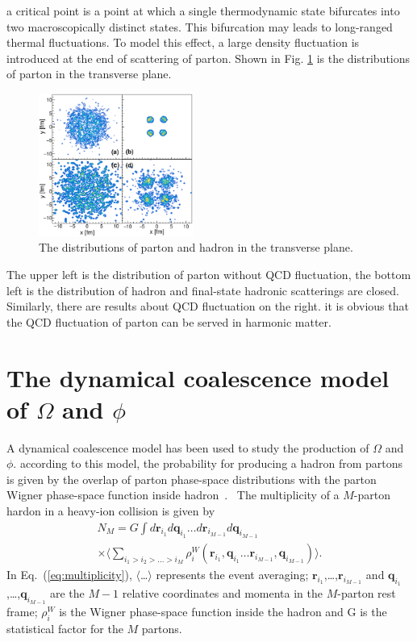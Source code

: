\documentclass[twocolumn,aps,prc,showpacs,superscriptaddress,preprintnumbers,floatfix,nofootinbib]{revtex4}
\begin{document}
\begin{CJK*}{GBK}{song}
  a critical point is a point at which a single thermodynamic state bifurcates
  into two macroscopically distinct states. This bifurcation may leads to long-ranged
  thermal fluctuations. To model this effect, a large density fluctuation is introduced
  at the end of scattering of parton. Shown in Fig. \ref{fig:phaseSpace} is the
  distributions of parton in the transverse plane.
  \begin{figure}[htbp]
    \centering
    \includegraphics[width=0.45\textwidth]{./figure/square.eps}
    \caption{The distributions of parton and hadron in the transverse plane.}
    \label{fig:phaseSpace}
  \end{figure}
  The upper left is the distribution of parton without QCD fluctuation, the bottom left
  is the distribution of hadron and final-state hadronic scatterings are closed.
  Similarly, there are results about QCD fluctuation on the right. it is obvious that
  the QCD fluctuation of parton can be served in harmonic matter.


  \section{The dynamical coalescence model of $\Omega$ and $\phi$}
  A dynamical coalescence model has been used to study the production
  of $\Omega$ and $\phi$. according to this model, the probability for producing
  a hadron from partons is given by the overlap of parton phase-space distributions
  with the parton Wigner phase-space function inside hadron~\cite{COALESCENCE1}. \
  The multiplicity of a $M$-parton
  hardon in a heavy-ion collision is given by
  \begin{multline}
    \label{eq:multiplicity}
    N_{M} = G  \int{}d\bm{r}_{i_{1}}d\bm{q}_{i_{1}}\dots{}d\bm{r}_{i_{M-1}}d\bm{q}_{i_{M-1}}\\
    \times{}\langle{}\sum_{i_{1}>i_{2}>\dots>i_{M}}\rho_{i}^{W}(\bm{r}_{i_{1}},\bm{q}_{i_{1}}\dots{}\bm{r}_{i_{M-1}},\bm{q}_{i_{M-1}}) \rangle{}.
  \end{multline}
  In Eq.~(\ref{eq:multiplicity}), $\langle{}$\dots$\rangle{}$ represents the event averaging;
  $\textbf{r}_{i_{1}}$,\dots{},$\textbf{r}_{i_{M-1}}$ and
  $\textbf{q}_{i_{1}}$,\dots,$\textbf{q}_{i_{M-1}}$ are the $M-1$ relative
  coordinates and momenta in the $M$-parton rest frame; $\rho_{i}^{W}$ is the
  Wigner phase-space function inside the hadron and G is the statistical factor for
  the $M$ partons.


\end{CJK*}
\end{document}

